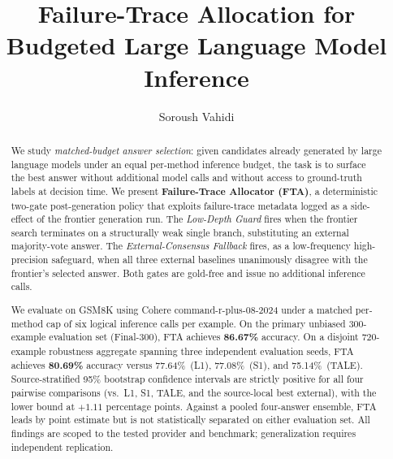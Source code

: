 \documentclass[smallcondensed]{svjour3}
\begin{document}
\title{Failure-Trace Allocation for Budgeted Large Language Model Inference}

\author{Soroush Vahidi}


\date{}
\maketitle

\begin{abstract}
We study \emph{matched-budget answer selection}: given candidates already
generated by large language models under an equal per-method inference budget,
the task is to surface the best answer without additional model calls and without
access to ground-truth labels at decision time.
We present \textbf{Failure-Trace Allocator (FTA)}, a deterministic two-gate
post-generation policy that exploits failure-trace metadata logged as a
side-effect of the frontier generation run.
The \emph{Low-Depth Guard} fires when the frontier search terminates on a
structurally weak single branch, substituting an external majority-vote answer.
The \emph{External-Consensus Fallback} fires, as a low-frequency high-precision
safeguard, when all three external baselines unanimously disagree with the
frontier's selected answer.
Both gates are gold-free and issue no additional inference calls.

We evaluate on GSM8K using Cohere command-r-plus-08-2024 under a matched
per-method cap of six logical inference calls per example.
On the primary unbiased 300-example evaluation set (Final-300), FTA achieves
\textbf{86.67\%} accuracy.
On a disjoint 720-example robustness aggregate spanning three independent
evaluation seeds, FTA achieves \textbf{80.69\%} accuracy versus 77.64\%~(L1),
77.08\%~(S1), and 75.14\%~(TALE).
Source-stratified 95\% bootstrap confidence intervals are strictly positive
for all four pairwise comparisons (vs.\ L1, S1, TALE, and the source-local
best external), with the lower bound at $+1.11$ percentage points.
Against a pooled four-answer ensemble, FTA leads by point estimate but is not
statistically separated on either evaluation set.
All findings are scoped to the tested provider and benchmark; generalization
requires independent replication.
\end{abstract}
\end{document}
